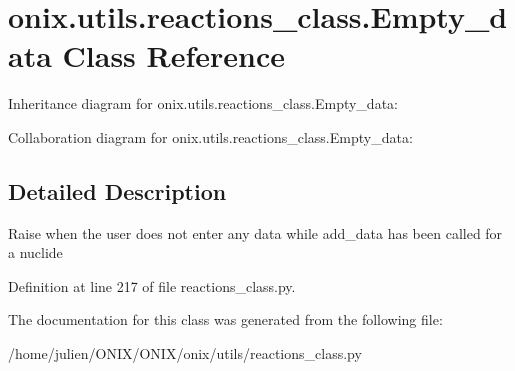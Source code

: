 \hypertarget{classonix_1_1utils_1_1reactions__class_1_1Empty__data}{}\section{onix.\+utils.\+reactions\+\_\+class.\+Empty\+\_\+data Class Reference}
\label{classonix_1_1utils_1_1reactions__class_1_1Empty__data}


Inheritance diagram for onix.\+utils.\+reactions\+\_\+class.\+Empty\+\_\+data\+:


Collaboration diagram for onix.\+utils.\+reactions\+\_\+class.\+Empty\+\_\+data\+:


\subsection{Detailed Description}
\begin{DoxyVerb}Raise when the user does not enter any data while add_data has been called for a nuclide\end{DoxyVerb}
 

Definition at line 217 of file reactions\+\_\+class.\+py.



The documentation for this class was generated from the following file\+:\begin{DoxyCompactItemize}
\item 
/home/julien/\+O\+N\+I\+X/\+O\+N\+I\+X/onix/utils/reactions\+\_\+class.\+py\end{DoxyCompactItemize}
